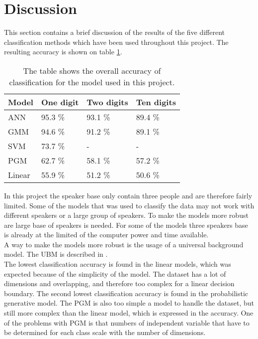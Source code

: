 \section*{Discussion}
This section contains a brief discussion of the results of the five different classification methods which have been used throughout this project. The resulting accuracy is shown on table \ref{table:result}.

\begin{table}[h]
\begin{tabular}{@{}l|lll@{}}
\toprule
Model 		   		   & One digit            & Two digits  & Ten digits   \\ \midrule
ANN                    & 95.3 \%                & 93.1 \%   & 89.4 \% \\
GMM                    & 94.6 \%                & 91.2 \%   & 89.1 \% \\
SVM                    & 73.7 \%                & - 	    & -       \\ 
PGM                    & 62.7 \% 				& 58.1 \%   & 57.2 \% \\
Linear                 & 55.9 \% 				& 51.2 \%   & 50.6 \%

\end{tabular}
\caption{The table shows the overall accuracy of classification for the model used in this project. }
\label{table:result}
\end{table}

In this project the speaker base only contain three people and are therefore fairly limited. 
Some of the models that was used to classify the data may not work with different speakers or a large group of speakers.
To make the models more robust are large base of speakers is needed.
For some of the models three speakers base is already at the limited of the computer power and time available.\\

A way to make the models more robust is the usage of a universal background model.
The UBM is described in \cite{Springer:36}.\\

The lowest classification accuracy is found in the linear models, which was expected because of the simplicity of the model.
The dataset has a lot of dimensions and overlapping, and therefore too complex for a linear decision boundary.
The second lowest classification accuracy is found in the probabilistic generative model. 
The PGM is also too simple a model to handle the dataset, but still more complex than the linear model, which is expressed in the accuracy.
One of the problems with PGM is that numbers of independent variable that have to be determined for each class scale with the number of dimensions.\\

